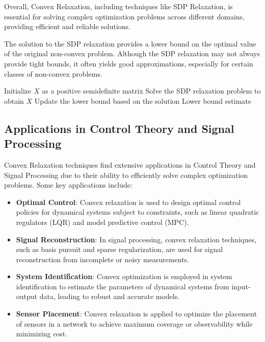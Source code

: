 \documentclass[12pt]{book} %
\begin{document}
Overall, Convex Relaxation, including techniques like SDP Relaxation, is essential for solving complex optimization problems across different domains, providing efficient and reliable solutions.


The solution to the SDP relaxation provides a lower bound on the optimal value of the original non-convex problem. Although the SDP relaxation may not always provide tight bounds, it often yields good approximations, especially for certain classes of non-convex problems.
\FloatBarrier
\begin{algorithm}[H]
\caption{SDP Relaxation Algorithm}
\begin{algorithmic}[1]
\State Initialize \(X\) as a positive semidefinite matrix
\Repeat
\State Solve the SDP relaxation problem to obtain \(X\)
\State Update the lower bound based on the solution
\Return Lower bound estimate
\end{algorithmic}
\end{algorithm}
\FloatBarrier

\subsection{Applications in Control Theory and Signal Processing}

Convex Relaxation techniques find extensive applications in Control Theory and Signal Processing due to their ability to efficiently solve complex optimization problems. Some key applications include:

\begin{itemize}
    \item \textbf{Optimal Control}: Convex relaxation is used to design optimal control policies for dynamical systems subject to constraints, such as linear quadratic regulators (LQR) and model predictive control (MPC).
    \item \textbf{Signal Reconstruction}: In signal processing, convex relaxation techniques, such as basis pursuit and sparse regularization, are used for signal reconstruction from incomplete or noisy measurements.
    \item \textbf{System Identification}: Convex optimization is employed in system identification to estimate the parameters of dynamical systems from input-output data, leading to robust and accurate models.
    \item \textbf{Sensor Placement}: Convex relaxation is applied to optimize the placement of sensors in a network to achieve maximum coverage or observability while minimizing cost.
\end{itemize}
\end{document}
